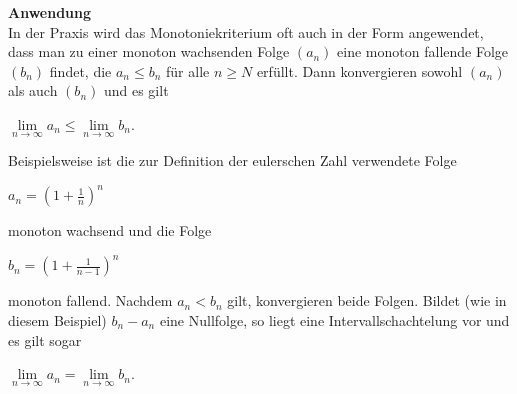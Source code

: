 \textbf{Anwendung}	\\

In der Praxis wird das Monotoniekriterium oft auch in der Form angewendet, dass man zu einer monoton wachsenden Folge $(a_{n})$ eine monoton fallende Folge $(b_{n})$ findet, die $ a_{n}\leq b_{n}$ für alle $n\geq N$ erfüllt. Dann konvergieren sowohl $(a_{n})$ als auch $(b_{n})$ und es gilt

$\lim\limits_{n \to \infty} a_{n}\leq \lim\limits_{n \to \infty }b_{n}$.

Beispielsweise ist die zur Definition der eulerschen Zahl verwendete Folge

$a_{n}=\left(1+{\frac {1}{n}}\right)^{n}$

monoton wachsend und die Folge

$b_{n}=\left(1+{\frac {1}{n-1}}\right)^{n}$

monoton fallend. Nachdem $a_{n}<b_{n}$ gilt, konvergieren beide Folgen. Bildet (wie in diesem Beispiel) $b_{n}-a_{n}$ eine Nullfolge, so liegt eine Intervallschachtelung vor und es gilt sogar

$\lim\limits_{n \to \infty}a_{n}=\lim \limits_{n \to \infty}b_{n}$. 